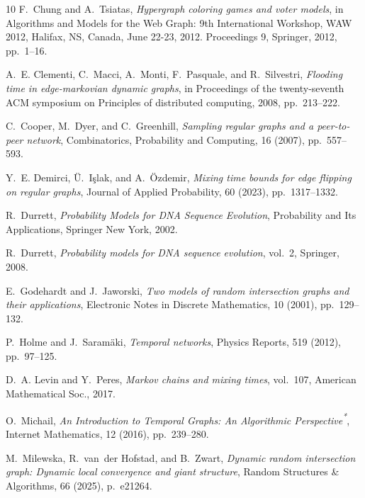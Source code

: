 \documentclass[11pt,a4paper]{article}
\begin{document}
\begin{thebibliography}{10}
{\sc F.~Chung and A.~Tsiatas}, {\em Hypergraph coloring games and voter models}, in Algorithms and Models for the Web Graph: 9th International Workshop, WAW 2012, Halifax, NS, Canada, June 22-23, 2012. Proceedings 9, Springer, 2012, pp.~1--16.

{\sc A.~E. Clementi, C.~Macci, A.~Monti, F.~Pasquale, and R.~Silvestri}, {\em Flooding time in edge-markovian dynamic graphs}, in Proceedings of the twenty-seventh ACM symposium on Principles of distributed computing, 2008, pp.~213--222.

{\sc C.~Cooper, M.~Dyer, and C.~Greenhill}, {\em Sampling regular graphs and a peer-to-peer network}, Combinatorics, Probability and Computing, 16 (2007), pp.~557--593.

{\sc Y.~E. Demirci, {\"U}.~I{\c{s}}lak, and A.~{\"O}zdemir}, {\em Mixing time bounds for edge flipping on regular graphs}, Journal of Applied Probability, 60 (2023), pp.~1317--1332.

{\sc R.~Durrett}, {\em Probability {{Models}} for {{DNA Sequence Evolution}}}, Probability and Its {{Applications}}, Springer New York, 2002.

{\sc R.~Durrett}, {\em Probability models for DNA sequence evolution}, vol.~2, Springer, 2008.

{\sc E.~Godehardt and J.~Jaworski}, {\em Two models of random intersection graphs and their applications}, Electronic Notes in Discrete Mathematics, 10 (2001), pp.~129--132.

{\sc P.~Holme and J.~Saram{\"a}ki}, {\em Temporal networks}, Physics Reports, 519 (2012), pp.~97--125.

{\sc D.~A. Levin and Y.~Peres}, {\em Markov chains and mixing times}, vol.~107, American Mathematical Soc., 2017.

{\sc O.~Michail}, {\em An {{Introduction}} to {{Temporal Graphs}}: {{An Algorithmic Perspective}}{\textsuperscript{*}}}, Internet Mathematics, 12 (2016), pp.~239--280.

{\sc M.~Milewska, R.~van~der Hofstad, and B.~Zwart}, {\em Dynamic random intersection graph: Dynamic local convergence and giant structure}, Random Structures \& Algorithms, 66 (2025), p.~e21264.


\end{thebibliography}
\end{document}
